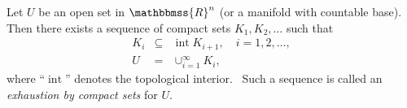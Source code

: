 \documentclass[12pt]{article}
\newcommand{\R}{\mathbbmss{R}}
\begin{document}
Let $U$ be an open set in $\R^n$ (or a manifold with countable base).
\,Then there exists a sequence of compact sets
 $K_1, K_2, \ldots$ such that 
\begin{eqnarray*}
      K_i &\subseteq& \operatorname{int} K_{i+1}, \quad i=1,2,\ldots, \\
      U &=& \cup_{i=1}^\infty K_i,
\end{eqnarray*}
where ``$\operatorname{int}$'' denotes the topological interior. \,
Such a sequence is called an \emph{exhaustion by compact sets}
for $U$.
\end{document}
